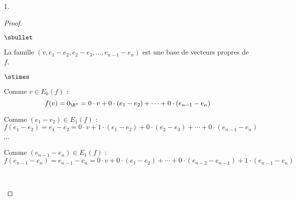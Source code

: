 \documentclass[11pt]{article}%
\begin{document}
\begin{noliste}{1.}
\begin{proof}
\begin{noliste}{$\sbullet$}


    \item La famille $(v,e_1- e_2, e_2-e_3, \ldots, e_{n-1} -e_n)$ est 
    une base de vecteurs propres de $f$.
    \begin{noliste}{$\stimes$}
     \item Comme $v\in E_0(f)$ : 
     \[
      f(v)=0_{\R^n} = 0 \cdot v + 0 \cdot 
      (e_1-e_2) + \cdots + 0 \cdot (e_{n-1}-e_n)
     \]
     
     \item Comme $(e_1-e_2)\in E_1(f)$ : 
     \[
      f(e_1-e_2)=e_1-e_2 = 0 \cdot 
      v + 1 \cdot (e_1-e_2) + 0 \cdot (e_2-e_3)+ \cdots + 0 \cdot 
      (e_{n-1}-e_n)
     \]
     
     \item $\cdots$
     
     \item Comme $(e_{n-1}-e_n)\in E_1(f)$ : 
     \[
      f(e_{n-1}-e_n)= 
      e_{n-1}-e_n = 0 \cdot v + 0 \cdot (e_1-e_2) + \cdots + 0 \cdot 
      (e_{n-2}-e_{n-1}) + 1 \cdot (e_{n-1}-e_n)
     \]
    \end{noliste}    
    ~\\[-1.6cm]
   \end{noliste}
  \end{proof}

\end{noliste}
\end{document}
